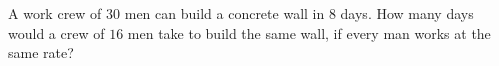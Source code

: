 A work crew of $30$ men can build a concrete wall in $8$ days. How many days would a crew of $16$ men take to build the same wall, if every man works at the same rate?
